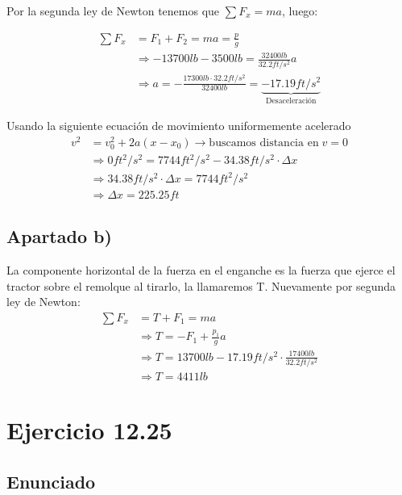 \documentclass[11pt]{article}
\begin{document}
Por la segunda ley de Newton tenemos que $\sum F_x = ma$, luego:

\begin{align*}
  \sum F_x &= F_1 + F_2 = ma = \frac{p}{g} \\
           &\Rightarrow -13700lb - 3500lb = \frac{32400lb}{32.2 ft/s^2}a \\
           &\Rightarrow a = - \frac{17300lb \cdot 32.2ft/s^2}{32400lb} 
           = \underbrace{-17.19ft/s^2}_{\text{Desaceleración}}
\end{align*}

Usando la siguiente ecuación de movimiento uniformemente acelerado
\begin{align*}
  v^2 &= v^2_0 +2a(x-x_0) \rightarrow \text{buscamos distancia en} \; v = 0 \\
      &\Rightarrow 0ft^2/s^2 = 7744ft^2/s^2 - 34.38ft/s^2 \cdot \Delta x \\
      &\Rightarrow 34.38ft/s^2 \cdot \Delta x = 7744ft^2/s^2 \\
      &\Rightarrow \Delta x = 225.25ft
\end{align*}

\subsection*{Apartado b)}

La componente horizontal de la fuerza en el enganche es la fuerza que ejerce
el tractor sobre el remolque al tirarlo, la llamaremos T.
Nuevamente por segunda ley de Newton:
\begin{align*}
  \sum F_x &= T + F_1 = ma \\
           &\Rightarrow T = -F_1 + \frac{p_1}{g}a \\
           &\Rightarrow T = 13700lb - 17.19ft/s^2 \cdot \frac{17400lb}{32.2ft/s^2} \\
           &\Rightarrow T = 4411lb
\end{align*}


\section*{Ejercicio 12.25}

\subsection*{Enunciado}
\end{document}
